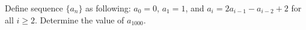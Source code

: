 Define sequence $\{a_n\}$ as following: $a_0=0$, $a_1=1$, and $a_{i}=2a_{i-1}-a_{i-2}+2$ for all $i\geq 2$. Determine the value of $a_{1000}.$
